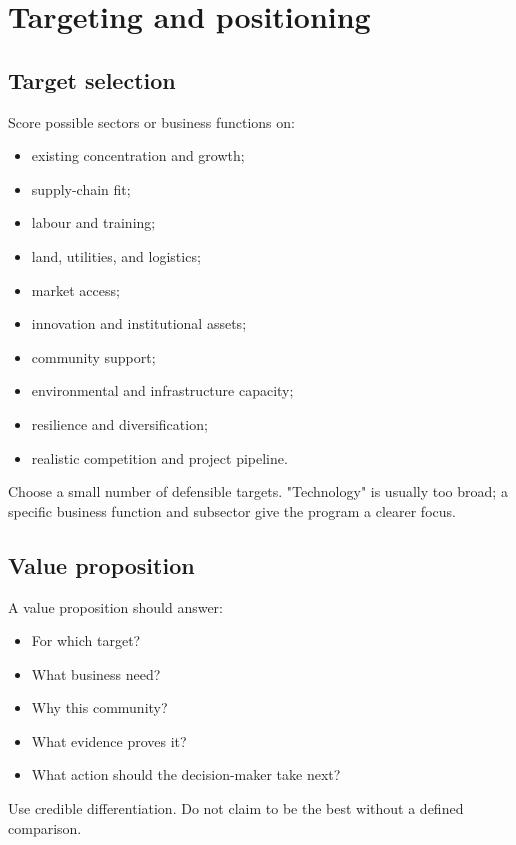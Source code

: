 \documentclass[11pt,letterpaper,oneside,openany]{book}
\begin{document}
\section[Targeting and positioning]{Targeting and positioning}
\subsection[Target selection]{Target selection}
Score possible sectors or business functions on:


\begin{itemize}
\item existing concentration and growth;
\item supply-chain fit;
\item labour and training;
\item land, utilities, and logistics;
\item market access;
\item innovation and institutional assets;
\item community support;
\item environmental and infrastructure capacity;
\item resilience and diversification;
\item realistic competition and project pipeline.
\end{itemize}


Choose a small number of defensible targets. "Technology" is usually too broad; a specific business function and subsector give the program a clearer focus.


\subsection[Value proposition]{Value proposition}
A value proposition should answer:


\begin{itemize}
\item For which target?
\item What business need?
\item Why this community?
\item What evidence proves it?
\item What action should the decision-maker take next?
\end{itemize}


Use credible differentiation. Do not claim to be the best without a defined comparison.
\end{document}
